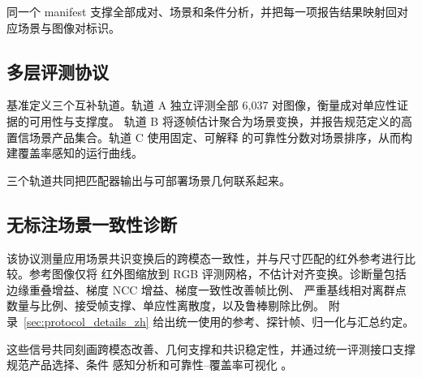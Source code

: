 同一个 manifest 支撑全部成对、场景和条件分析，并把每一项报告结果映射回对应场景与图像对标识。

\subsection{多层评测协议}

基准定义三个互补轨道。轨道 A 独立评测全部 6,037 对图像，衡量成对单应性证据的可用性与支撑度。
轨道 B 将逐帧估计聚合为场景变换，并报告规范定义的高置信场景产品集合。轨道 C 使用固定、可解释
的可靠性分数对场景排序，从而构建覆盖率感知的运行曲线。

三个轨道共同把匹配器输出与可部署场景几何联系起来。

\subsection{无标注场景一致性诊断}

该协议测量应用场景共识变换后的跨模态一致性，并与尺寸匹配的红外参考进行比较。参考图像仅将
红外图缩放到 RGB 评测网格，不估计对齐变换。诊断量包括边缘重叠增益、梯度 NCC 增益、梯度一致性改善帧比例、
严重基线相对离群点数量与比例、接受帧支撑、单应性离散度，以及鲁棒剔除比例。
附录~\ref{sec:protocol_details_zh} 给出统一使用的参考、探针帧、归一化与汇总约定。

这些信号共同刻画跨模态改善、几何支撑和共识稳定性，并通过统一评测接口支撑规范产品选择、条件
感知分析和可靠性--覆盖率可视化 \cite{ma2021survey,liao2024survey}。
